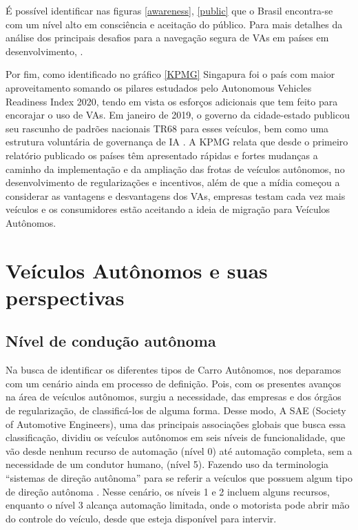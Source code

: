 É possível identificar nas figuras \ref{awareness}, \ref{public} que o Brasil encontra-se com um nível alto em consciência e aceitação do público. Para mais detalhes da análise dos principais desafios para a navegação segura de VAs em países em desenvolvimento, \cite{mundobrasil}.


Por fim, como identificado no gráfico \ref{KPMG} Singapura foi o país com maior aproveitamento somando os pilares estudados pelo Autonomous Vehicles Readiness Index 2020, tendo em vista os esforços adicionais que tem feito para encorajar o uso de VAs. Em janeiro de 2019, o governo da cidade-estado publicou seu rascunho de padrões nacionais TR68 para esses veículos, bem como uma estrutura voluntária de governança de IA \cite{KPMG}. A KPMG relata que desde o primeiro relatório publicado os países têm apresentado rápidas e fortes mudanças a caminho da implementação e da ampliação das frotas de veículos autônomos, no desenvolvimento de regularizações e incentivos, além de que a mídia começou a considerar as vantagens e desvantagens dos VAs, empresas testam cada vez mais veículos e os consumidores estão aceitando a ideia de migração para Veículos Autônomos.

\section{Veículos Autônomos e suas perspectivas}

\subsection{Nível de condução autônoma}
	
Na busca de identificar os diferentes tipos de Carro Autônomos, nos deparamos com um cenário ainda em processo de definição. Pois, com os presentes avanços na área de veículos autônomos, surgiu a necessidade, das empresas e dos órgãos de regularização, de classificá-los de alguma forma. Desse modo, A SAE (Society of Automotive Engineers), uma das principais associações globais que busca essa classificação, dividiu os veículos autônomos em seis níveis de funcionalidade, que vão desde nenhum recurso de automação (nível 0) até automação completa, sem a necessidade de um condutor humano, (nível 5). Fazendo uso da terminologia “sistemas de direção autônoma” para se referir a veículos que possuem algum tipo de direção autônoma \cite{SAE}. Nesse cenário, os níveis 1 e 2 incluem alguns recursos, enquanto o nível 3 alcança automação limitada, onde o motorista pode abrir mão do controle do veículo, desde que esteja disponível para intervir.

